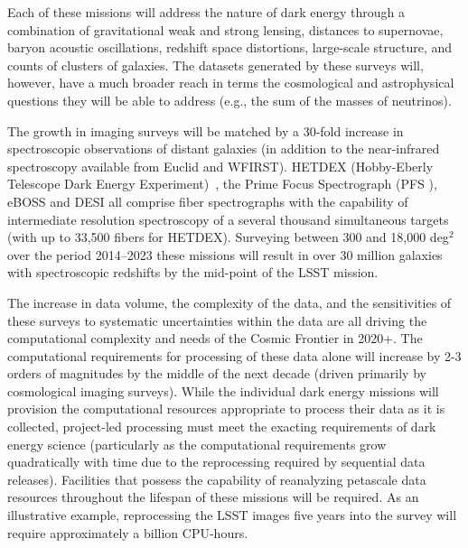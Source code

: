 Each of these missions will address the nature of dark energy through
a combination of gravitational weak and strong lensing, distances to
supernovae, baryon acoustic oscillations, redshift space distortions,
large-scale structure, and counts of clusters of galaxies. The
datasets generated by these surveys will, however, have a much broader
reach in terms the cosmological and astrophysical questions they will
be able to address (e.g., the sum of the masses of neutrinos).

The growth in imaging surveys will be matched by a 30-fold increase in
spectroscopic observations of distant galaxies (in addition to the
near-infrared spectroscopy available from Euclid and WFIRST). HETDEX
(Hobby-Eberly Telescope Dark Energy Experiment)~\cite{hetdex}, the
Prime Focus Spectrograph (PFS \cite{pfs}), eBOSS and DESI all comprise
fiber spectrographs with the capability of intermediate resolution
spectroscopy of a several thousand simultaneous targets (with up to
33,500 fibers for HETDEX). Surveying between 300 and 18,000 deg$^{2}$
over the period 2014--2023 these missions will result in over 30
million galaxies with spectroscopic redshifts by the mid-point of the
LSST mission.

The increase in data volume, the complexity of the data, and the
sensitivities of these surveys to systematic uncertainties within the
data are all driving the computational complexity and needs of the
Cosmic Frontier in 2020+. The computational requirements for
processing of these data alone will increase by 2-3 orders of
magnitudes by the middle of the next decade (driven primarily by
cosmological imaging surveys). While the individual dark energy
missions will provision the computational resources appropriate to
process their data as it is collected, project-led processing must
meet the exacting requirements of dark energy science (particularly as
the computational requirements grow quadratically with time due to the
reprocessing required by sequential data releases). Facilities that
possess the capability of reanalyzing petascale data resources
throughout the lifespan of these missions will be required. As an
illustrative example, reprocessing the LSST images five years into the
survey will require approximately a billion CPU-hours.

\medskip


